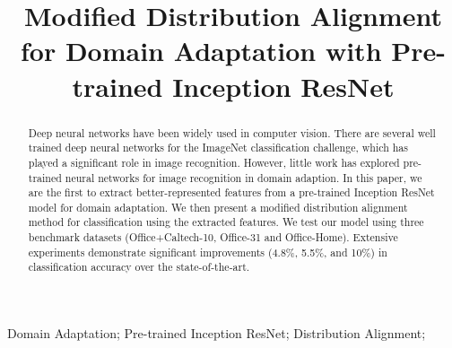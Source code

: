 \documentclass[10pt, conference, compsocconf]{IEEEtran}
\begin{document}
\title{Modified Distribution Alignment for Domain Adaptation  with Pre-trained Inception ResNet}




\author{
}


\author{
\and
{}
}










\maketitle


\begin{abstract}
Deep neural networks have been widely used in computer vision. There are several well trained deep neural networks for the ImageNet classification challenge, which has played a significant role in image recognition. However, little work has explored pre-trained neural networks for image recognition in domain adaption. In this paper, we are the first to extract better-represented features from a pre-trained Inception ResNet model for domain adaptation. We then present a modified distribution alignment method for classification using the extracted features. We test our model using three benchmark datasets (Office+Caltech-10, Office-31 and Office-Home). Extensive experiments demonstrate significant improvements (4.8\%, 5.5\%, and 10\%) in classification accuracy over the state-of-the-art. 

\end{abstract}

\begin{IEEEkeywords}
Domain Adaptation;  Pre-trained Inception ResNet; Distribution Alignment;

\end{IEEEkeywords}
\end{document}
